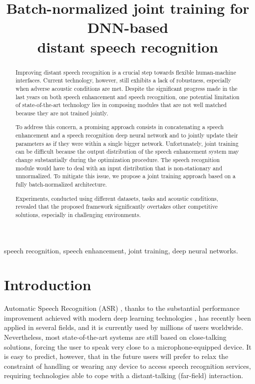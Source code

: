 \documentclass{article}
\title{Batch-normalized joint training for DNN-based \\ distant speech recognition}
\begin{document}
%
\maketitle
%
\begin{abstract}
Improving distant speech recognition is a crucial step towards flexible human-machine interfaces. Current technology, however, still exhibits a lack of robustness, especially when adverse acoustic conditions are met.  Despite the significant progress made in the last years on both speech enhancement and speech recognition, one potential limitation of state-of-the-art technology lies in composing modules that are not well matched because they are not trained jointly. 

To address this concern,  a promising approach consists in concatenating a speech enhancement and a speech recognition deep neural network and  to jointly update their parameters as if they were within a single bigger network.
Unfortunately, joint training can be difficult because the output distribution of the speech enhancement system may change substantially during the optimization procedure. The speech recognition module would have to deal with an input distribution that is non-stationary and unnormalized. To mitigate this issue, we propose a joint training approach based on a fully batch-normalized architecture.

Experiments, conducted using different datasets, tasks and acoustic conditions, revealed that the proposed framework significantly overtakes other competitive solutions, especially in challenging environments.
\end{abstract}
%
\begin{keywords}
speech recognition, speech enhancement, joint training, deep neural networks.
\end{keywords}
%
\section{Introduction}
\label{sec:intro}
Automatic Speech Recognition (ASR) \cite{lideng}, thanks to the substantial performance improvement achieved with modern deep learning technologies \cite{Goodfellow-et-al-2016-Book}, has recently been applied in several fields, %
and it is currently  used by millions of users worldwide. 
Nevertheless, most state-of-the-art systems are still based on close-talking solutions, forcing the user to speak very close to a microphone-equipped device. 
It is easy to predict, however, that in the future users will prefer to relax the constraint of handling or wearing any device to access speech recognition services, requiring technologies able to cope with a distant-talking (far-field) interaction. %
\end{document}
